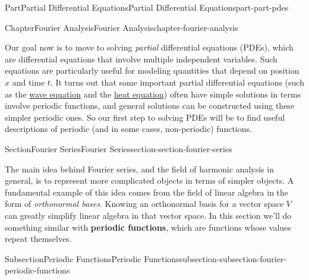 \documentclass[twoside,10pt,]{book}
\newcommand{\terminology}[1]{\textbf{#1}}
\numberwithin{equation}{part}
\begin{document}
\begin{partptx}{Part}{Partial Differential Equations}{}{Partial Differential Equations}{}{}{part-part-pdes}
\renewcommand*{\partname}{Part}
%
\typeout{************************************************}
\typeout{************************************************}
%
\begin{chapterptx}{Chapter}{Fourier Analysis}{}{Fourier Analysis}{}{}{chapter-fourier-analysis}
\renewcommand*{\chaptername}{Chapter}
\begin{introduction}{}%
Our goal now is to move to solving \emph{partial} differential equations (PDEs), which are differential equations that involve multiple independent variables. Such equations are particularly useful for modeling quantities that depend on position \(x\) and time \(t\). It turns out that some important partial differential equations (such as the \hyperref[men-equation-wave-pde]{wave equation} and the \hyperref[men-equation-heat-pde]{heat equation}) often have simple solutions in terms involve periodic functions, and general solutions can be constructed using these simpler periodic ones. So our first step to solving PDEs will be to find useful descriptions of periodic (and in some cases, non-periodic) functions.%
\end{introduction}%
%
%
\typeout{************************************************}
\typeout{************************************************}
%
\begin{sectionptx}{Section}{Fourier Series}{}{Fourier Series}{}{}{section-section-fourier-series}
\begin{introduction}{}%
The main idea behind Fourier series, and the field of harmonic analysis in general, is to represent more complicated objects in terms of simpler objects. A fundamental example of this idea comes from the field of linear algebra in the form of \emph{orthonormal bases}. Knowing an orthonormal basis for a vector space \(V\) can greatly simplify linear algebra in that vector space. In this section we'll do something similar with \terminology{periodic functions}, which are functions whose values repeat themselves.%
\end{introduction}%
%
%
\typeout{************************************************}
\typeout{************************************************}
%
\begin{subsectionptx}{Subsection}{Periodic Functions}{}{Periodic Functions}{}{}{subsection-subsection-fourier-periodic-functions}

\end{subsectionptx}
\end{sectionptx}
\end{chapterptx}
\end{partptx}
\end{document}
